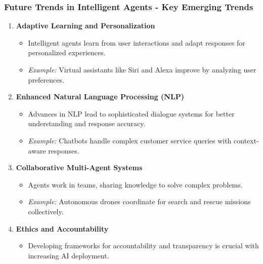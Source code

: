 \documentclass[aspectratio=169]{beamer}
\begin{document}
\begin{frame}[fragile]
    \frametitle{Future Trends in Intelligent Agents - Key Emerging Trends}
    \begin{enumerate}
        \item \textbf{Adaptive Learning and Personalization}
        \begin{itemize}
            \item Intelligent agents learn from user interactions and adapt responses for personalized experiences.
            \item \textit{Example:} Virtual assistants like Siri and Alexa improve by analyzing user preferences.
        \end{itemize}
        
        \item \textbf{Enhanced Natural Language Processing (NLP)}
        \begin{itemize}
            \item Advances in NLP lead to sophisticated dialogue systems for better understanding and response accuracy.
            \item \textit{Example:} Chatbots handle complex customer service queries with context-aware responses.
        \end{itemize}

        \item \textbf{Collaborative Multi-Agent Systems}
        \begin{itemize}
            \item Agents work in teams, sharing knowledge to solve complex problems.
            \item \textit{Example:} Autonomous drones coordinate for search and rescue missions collectively.
        \end{itemize}

        \item \textbf{Ethics and Accountability}
        \begin{itemize}
            \item Developing frameworks for accountability and transparency is crucial with increasing AI deployment.
        \end{itemize}
    \end{enumerate}
\end{frame}
\end{document}
